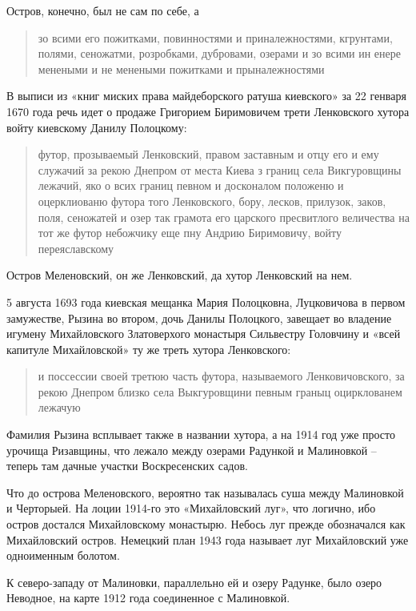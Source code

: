 Остров, конечно, был не сам по себе, а

\begin{quotation}
зо всими его пожитками, повинностями и приналежностями, кгрунтами, полями, сеножатми, розробками, дубровами, озерами и зо всими ин енере менеными и не менеными пожитками и прыналежностями
\end{quotation}

В выписи из «книг миских права майдеборского ратуша киевского» за 22 генваря 1670 года речь идет о продаже Григорием Биримовичем трети Ленковского хутора войту киевскому Данилу Полоцкому\cite{mihdocs}:

\begin{quotation}
футор, прозываемый Ленковский, правом заставным и отцу его и ему служачий за рекою Днепром от места Киева з границ села Викгуровщины лежачий, яко о всих границ певном и досконалом положеню и оцерклиованю футора того Ленковского, бору, лесков, прилузок, заков, поля, сеножатей и озер так грамота его царского пресвитлого величества на тот же футор небожчику еще пну Андрию Биримовичу, войту переяславскому
\end{quotation}

Остров Меленовский, он же Ленковский, да хутор Ленковский на нем.

5 августа 1693 года киевская мещанка Мария Полоцковна, Луцковичова в первом замужестве, Рызина во втором, дочь Данилы Полоцкого, завещает во владение игумену Михайловского Златоверхого монастыря Сильвестру Головчину и «всей капитуле Михайловской» ту же треть хутора Ленковского\cite{mihdocs}: 

\begin{quotation}
и поссессии своей третюю часть футора, называемого Ленковичовского, за рекою Днепром близко села Выкгуровщини певным граныц оцирклованем лежачую
\end{quotation}

Фамилия Рызина всплывает также в названии хутора, а на 1914 год уже просто урочища Ризавщины, что лежало между озерами Радункой и Малиновкой – теперь там дачные участки Воскресенских садов.

Что до острова Меленовского, вероятно так называлась суша между Малиновкой и Черторыей. На лоции 1914-го это «Михайловский луг», что логично, ибо остров достался Михайловскому монастырю. Небось луг прежде обозначался как Михайловский остров. Немецкий план 1943 года называет луг Михайловский уже одноименным болотом.

К северо-западу от Малиновки, параллельно ей и озеру Радунке, было озеро Неводное, на карте 1912 года соединенное с Малиновкой.%

